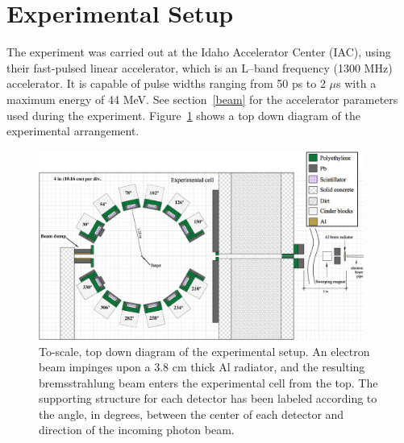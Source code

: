 
\section{Experimental Setup}
The experiment was carried out at the Idaho Accelerator Center (IAC), using their fast-pulsed linear accelerator, which is an L--band frequency (1300 MHz) accelerator.
It is capable of pulse widths ranging from 50 ps to 2 $\mu$s with a maximum energy of 44 MeV.
See section~\ref{beam} for the accelerator parameters used during the experiment.
Figure~\ref{fig:Facility} shows a top down diagram of the experimental arrangement.

\begin{figure}[h]
\centering
\includegraphics[width=0.95\textwidth]{Content/Methods/ExpArangment.jpg}
\caption{To-scale, top down diagram of the experimental setup.
An electron beam impinges upon a 3.8 cm thick Al radiator, and the resulting bremsstrahlung beam enters the experimental cell from the top.
The supporting structure for each detector has been labeled according to the angle, in degrees, between the center of each detector and direction of the incoming photon beam.
}
\label{fig:Facility}
\end{figure}
